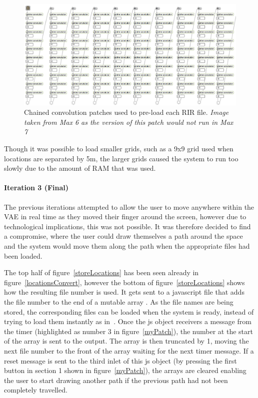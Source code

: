 \documentclass[../../main.tex]{subfiles}
\begin{document}
			\begin{figure}[H]
				\centerline{\includegraphics[scale = 0.4]{Sections/Implementation/Max/images/Max/Iteration2/preload.png}}
				\caption{Chained convolution patches used to pre-load each \ac{RIR} file. \textit{Image taken from Max 6 as the version of this patch would not run in Max 7}}
				\label{preload}
			\end{figure}


			Though it was possible to load smaller grids, such as a 9x9 grid used when locations are separated by 5m, the larger grids caused the system to run too slowly due to the amount of RAM that was used.

		 \paragraph{Iteration 3 (Final)}
		 \label{iteration3}

		 	The previous iterations attempted to allow the user to move anywhere within the \ac{VAE} in real time as they moved their finger around the screen, however due to technological implications, this was not possible. It was therefore decided to find a compromise, where the user could draw themselves a path around the space and the system would move them along the path when the appropriate files had been loaded.

		 	The top half of figure~\ref{storeLocations} has been seen already in figure~\ref{locationsConvert}, however the bottom of figure~\ref{storeLocations} shows how the resulting file number is used. It gets sent to a javascript file that adds the file number to the end of a mutable array \footnotemark[1]. As the file names are being stored, the corresponding files can be loaded when the system is ready, instead of trying to load them instantly as in~. Once the js object receivers a message from the timer (highlighted as number 3 in figure~\ref{myPatch}), the number at the start of the array is sent to the output. The array is then truncated by 1, moving the next file number to the front of the array waiting for the next timer message. If a reset message is sent to the third inlet of this js object (by pressing the first button in section 1 shown in figure~\ref{myPatch}), the arrays are cleared enabling the user to start drawing another path if the previous path had not been completely travelled.
\end{document}
